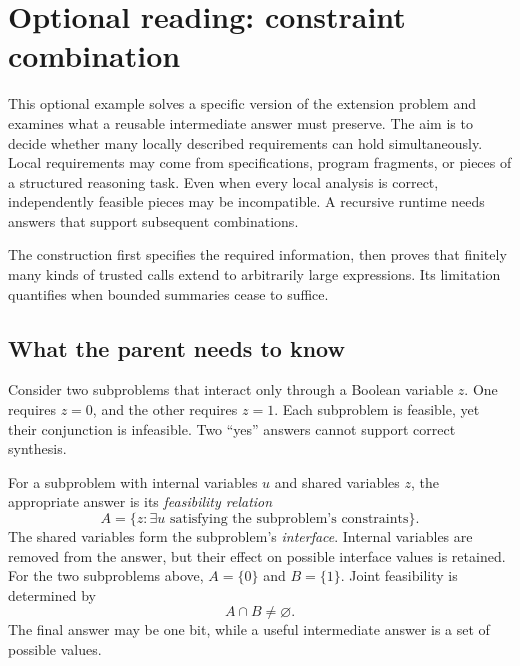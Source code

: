 \documentclass[11pt,twoside]{article}
\theoremstyle{definition}
\theoremstyle{remark}
\begin{document}
\section{Optional reading: constraint combination}
\label{sec:constraints}

This optional example solves a specific version of the extension problem
and examines what a reusable intermediate answer must preserve. The aim is to
decide whether many locally described requirements can hold simultaneously.
Local requirements may come from specifications, program fragments, or
pieces of a structured reasoning task. Even when every local analysis is
correct, independently feasible pieces may be incompatible. A recursive
runtime needs answers that support subsequent combinations.

The construction first specifies the
required information, then proves that finitely many kinds of trusted calls
extend to arbitrarily large expressions. Its limitation quantifies when
bounded summaries cease to suffice.

\subsection{What the parent needs to know}

Consider two subproblems that interact only through a Boolean variable
$z$. One requires $z=0$, and the other requires $z=1$. Each subproblem is
feasible, yet their conjunction is infeasible. Two ``yes'' answers cannot
support correct synthesis.

For a subproblem with internal variables $u$ and shared variables $z$, the
appropriate answer is its \emph{feasibility relation}
\begin{equation}
 A=\{z:\exists u\text{ satisfying the subproblem's constraints}\}.
 \label{eq:boundary-relation}
\end{equation}
The shared variables form the subproblem's \emph{interface}. Internal
variables are removed from the answer, but their effect on possible
interface values is retained. For the two subproblems above,
$A=\{0\}$ and $B=\{1\}$. Joint feasibility is determined by
\begin{equation}
 A\cap B\ne\varnothing.
 \label{eq:intersection-feasible}
\end{equation}
The final answer may be one bit, while a useful intermediate answer is a
set of possible values.
\end{document}
